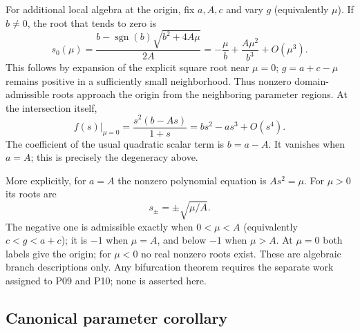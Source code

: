 For additional local algebra at the origin, fix $a,A,c$ and vary $g$
(equivalently $\mu$). If $b\ne0$, the root that tends to zero is
\begin{equation}
\label{eq:P02-local-branch}
 s_0(\mu)=\frac{b-\operatorname{sgn}(b)\sqrt{b^2+4A\mu}}{2A}
        =-\frac{\mu}{b}+\frac{A\mu^2}{b^3}+O(\mu^3).
\end{equation}
This follows by expansion of the explicit square root near $\mu=0$;
$g=a+c-\mu$ remains positive in a sufficiently small neighborhood.
Thus nonzero domain-admissible roots approach the origin from the
neighboring parameter regions. At the intersection itself,
\begin{equation}
\label{eq:P02-quadratic-coefficient}
 f(s)\big|_{\mu=0}=\frac{s^2(b-As)}{1+s}
                     =bs^2-as^3+O(s^4).
\end{equation}
The coefficient of the usual quadratic scalar term is $b=a-A$.
It vanishes when $a=A$; this is precisely the degeneracy above.

More explicitly, for $a=A$ the nonzero polynomial equation is
$As^2=\mu$. For $\mu>0$ its roots are
\begin{equation}
\label{eq:P02-square-root-branches}
 s_\pm=\pm\sqrt{\mu/A}.
\end{equation}
The negative one is admissible exactly when $0<\mu<A$ (equivalently
$c<g<a+c$); it is $-1$ when $\mu=A$, and below $-1$ when $\mu>A$.
At $\mu=0$ both labels give the origin; for $\mu<0$ no real
nonzero roots exist. These are algebraic branch descriptions only.
Any bifurcation theorem requires the separate work assigned to P09
and P10; none is asserted here.

\subsection{Canonical parameter corollary}

